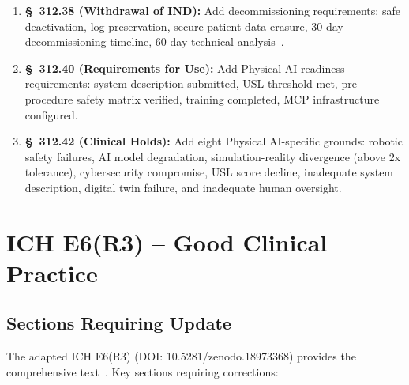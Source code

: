 \documentclass[11pt,letterpaper]{article}
\begin{document}
\begin{enumerate}[label=(\alph*)]
\item \textbf{\S~312.38 (Withdrawal of IND):} Add decommissioning
  requirements: safe deactivation, log preservation, secure patient data
  erasure, 30-day decommissioning timeline, 60-day technical
  analysis~\cite{cfr312adapt}.

\item \textbf{\S~312.40 (Requirements for Use):} Add Physical AI readiness
  requirements: system description submitted, USL threshold met, pre-procedure
  safety matrix verified, training completed, MCP infrastructure configured.

\item \textbf{\S~312.42 (Clinical Holds):} Add eight Physical AI-specific
  grounds: robotic safety failures, AI model degradation, simulation-reality
  divergence (above 2x tolerance), cybersecurity compromise, USL score
  decline, inadequate system description, digital twin failure, and
  inadequate human oversight.
\end{enumerate}

\section{ICH E6(R3) -- Good Clinical Practice}

\subsection{Sections Requiring Update}

The adapted ICH E6(R3) (DOI: 10.5281/zenodo.18973368) provides the
comprehensive text~\cite{iche6r3adapt}. Key sections requiring corrections:
\end{document}
